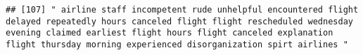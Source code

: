 \documentclass[
]{article}
\begin{document}
\begin{verbatim}
## [107] " airline staff incompetent rude unhelpful encountered flight delayed repeatedly hours canceled flight flight rescheduled wednesday evening claimed earliest flight hours flight canceled explanation flight thursday morning experienced disorganization spirt airlines "                                                                                                                                                                                                                                                                                                                                                                                                                                                                                                                                                                                                                                                                                                                                                                                                                                                                                                                                                                                                                                                                                                                                                                                                                                                                                                                                                                                                                                                                                                                      

\end{verbatim}
\end{document}
